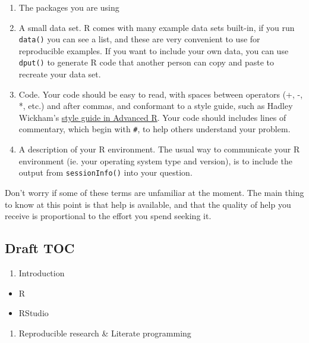 \documentclass[]{book}
\providecommand{\tightlist}{%
  \setlength{\itemsep}{0pt}\setlength{\parskip}{0pt}}
\begin{document}
\begin{enumerate}
\def\labelenumi{\arabic{enumi}.}
\tightlist
\item
  The packages you are using\\
\item
  A small data set. R comes with many example data sets built-in, if you
  run \texttt{data()} you can see a list, and these are very convenient
  to use for reproducible examples. If you want to include your own
  data, you can use \texttt{dput()} to generate R code that another
  person can copy and paste to recreate your data set.\\
\item
  Code. Your code should be easy to read, with spaces between operators
  (+, -, *, etc.) and after commas, and conformant to a style guide,
  such as Hadley Wickham's \citeyearpar{wickham2014advanced}
  \href{http://adv-r.had.co.nz/Style.html}{style guide in Advanced R}.
  Your code should includes lines of commentary, which begin with
  \texttt{\#}, to help others understand your problem.\\
\item
  A description of your R environment. The usual way to communicate your
  R environment (ie. your operating system type and version), is to
  include the output from \texttt{sessionInfo()} into your question.
\end{enumerate}

Don't worry if some of these terms are unfamiliar at the moment. The
main thing to know at this point is that help is available, and that the
quality of help you receive is proportional to the effort you spend
seeking it.

\subsection{Draft TOC}\label{draft-toc}

\begin{enumerate}
\def\labelenumi{\arabic{enumi}.}
\tightlist
\item
  Introduction
\end{enumerate}

\begin{itemize}
\tightlist
\item
  R
\item
  RStudio
\end{itemize}

\begin{enumerate}
\def\labelenumi{\arabic{enumi}.}
\setcounter{enumi}{1}
\tightlist
\item
  Reproducible research \& Literate programming
\end{enumerate}
\end{document}
